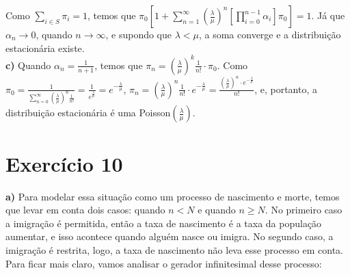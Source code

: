 \documentclass[12pt]{article}
\begin{document}
	Como $ \sum_{i \in S} \pi_i = 1 $, temos que $ \pi_0 \left[1 + \sum_{n=1}^{\infty} \left(\frac{\lambda}{\mu}\right)^n \left[\prod_{i=0}^{n-1} \alpha_{i}\right] \pi_0\right] = 1 $. Já que $ \alpha_n \to 0 $, quando $ n \to \infty$, e supondo que $ \lambda < \mu $, a soma converge e a distribuição estacionária existe. \\
	
	\textbf{c)} Quando $ \alpha_n = \frac{1}{n+1} $, temos que $ \pi_n = \left(\frac{\lambda}{\mu}\right)^k \frac{1}{n!} \cdot \pi_0 $. Como $ \pi_0 = \frac{1}{\sum_{n=0}^{\infty}\left(\frac{\lambda}{\mu}\right)^n \frac{1}{n!}} = \frac{1}{e^{\frac{\lambda}{\mu}}} = e^{-\frac{\lambda}{\mu}}$, $ \pi_n = \left(\frac{\lambda}{\mu}\right)^n \frac{1}{n!} \cdot e^{-\frac{\lambda}{\mu}} = \frac{\left(\frac{\lambda}{\mu}\right)^n \cdot e^{-\frac{\lambda}{\mu}}}{n!}$, e, portanto, a distribuição estacionária é uma Poisson$ \left(\frac{\lambda}{\mu}\right) $.
	
	\section*{Exercício 10}
	
	\textbf{a)} Para modelar essa situação como um processo de nascimento e morte, temos que levar em conta dois casos: quando $ n < N $ e quando $ n \geq N $. No primeiro caso a imigração é permitida, então a taxa de nascimento é a taxa da população aumentar, e isso acontece quando alguém nasce ou imigra. No segundo caso, a imigração é restrita, logo, a taxa de nascimento não leva esse processo em conta. Para ficar mais claro, vamos analisar o gerador infinitesimal desse processo:
	
\end{document}
